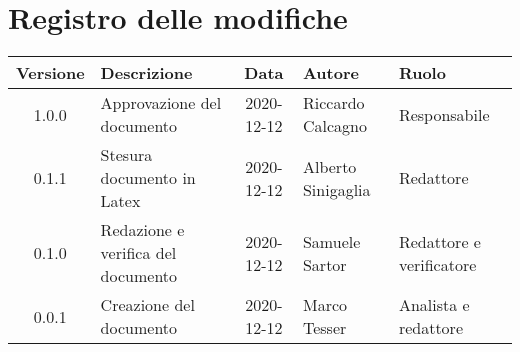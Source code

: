 \section*{Registro delle modifiche}

\begin{center}
	\begin{longtable}{|c|p{3.5cm}|c|p{3cm}|p{3cm}|}
		\hline
		\rowcolor{lighter-grayer}
		\textbf{Versione} & \textbf{Descrizione} & \textbf{Data} & \textbf{Autore} & \textbf{Ruolo} \\
		\hline
		\endfirsthead
		1.0.0 & Approvazione del documento & 2020-12-12 & Riccardo Calcagno & Responsabile \\
		\hline
		0.1.1 & Stesura documento in Latex & 2020-12-12 & Alberto Sinigaglia & Redattore \\
		\hline
		0.1.0 & Redazione e verifica del documento & 2020-12-12 & Samuele Sartor & Redattore e verificatore \\
		\hline
		0.0.1 & Creazione del documento & 2020-12-12 & Marco Tesser & Analista e redattore \\
		\hline

	\end{longtable}
\end{center}
